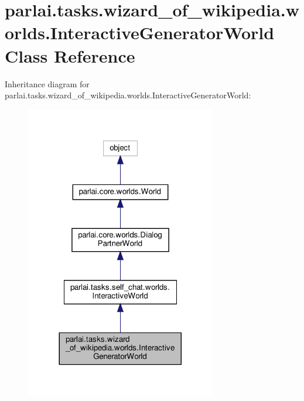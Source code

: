 \hypertarget{classparlai_1_1tasks_1_1wizard__of__wikipedia_1_1worlds_1_1InteractiveGeneratorWorld}{}\section{parlai.\+tasks.\+wizard\+\_\+of\+\_\+wikipedia.\+worlds.\+Interactive\+Generator\+World Class Reference}
\label{classparlai_1_1tasks_1_1wizard__of__wikipedia_1_1worlds_1_1InteractiveGeneratorWorld}


Inheritance diagram for parlai.\+tasks.\+wizard\+\_\+of\+\_\+wikipedia.\+worlds.\+Interactive\+Generator\+World\+:
\nopagebreak
\begin{figure}[H]
\begin{center}
\leavevmode
\includegraphics[width=236pt]{da/dce/classparlai_1_1tasks_1_1wizard__of__wikipedia_1_1worlds_1_1InteractiveGeneratorWorld__inherit__graph}
\end{center}
\end{figure}


